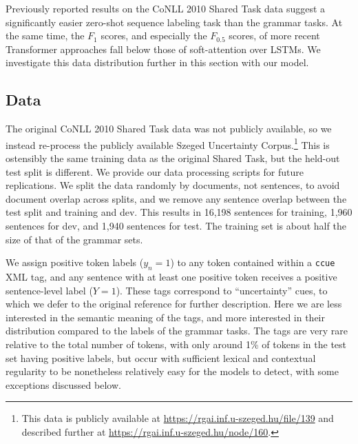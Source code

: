 \documentclass{clv3}
\begin{document}

Previously reported results on the CoNLL 2010 Shared Task \cite{FarkasEtal-2010-CoNLL2010} data suggest a significantly easier zero-shot sequence labeling task than the grammar tasks. At the same time, the $F_1$ scores, and especially the $F_{0.5}$ scores, of more recent Transformer approaches fall below those of soft-attention over LSTMs. We investigate this data distribution further in this section with our model.

\subsection{Data}

The original CoNLL 2010 Shared Task data was not publicly available, so we instead re-process the publicly available Szeged Uncertainty Corpus.\footnote{This data is publicly available at \url{https://rgai.inf.u-szeged.hu/file/139} and described further at \url{https://rgai.inf.u-szeged.hu/node/160}.} This is ostensibly the same training data as the original Shared Task, but the held-out test split is different. We provide our data processing scripts for future replications. We split the data randomly by documents, not sentences, to avoid document overlap across splits, and we remove any sentence overlap between the test split and training and dev. This results in 16,198 sentences for training, 1,960 sentences for dev, and 1,940 sentences for test. The training set is about half the size of that of the grammar sets.

We assign positive token labels ($y_n=1$) to any token contained within a \texttt{ccue} XML tag, and any sentence with at least one positive token receives a positive sentence-level label ($Y=1$). These tags correspond to ``uncertainty'' cues, to which we defer to the original reference for further description. Here we are less interested in the semantic meaning of the tags, and more interested in their distribution compared to the labels of the grammar tasks. The tags are very rare relative to the total number of tokens, with only around 1\% of tokens in the test set having positive labels, but occur with sufficient lexical and contextual regularity to be nonetheless relatively easy for the models to detect, with some exceptions discussed below.
\end{document}

